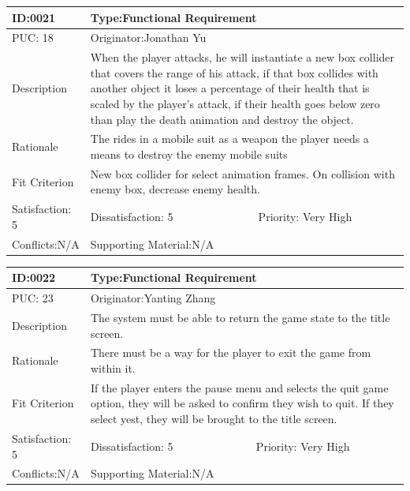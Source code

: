 \documentclass{article}
\begin{document}
	\begin{table}[H]
		\begin{tabular}{|l|l|l|}
			\hline
			ID:0021 & \multicolumn{2}{l|}{Type:Functional Requirement} \\ \hline
			PUC: 18& \multicolumn{2}{l|}{Originator:Jonathan Yu} \\ \hline
			Description & \multicolumn{2}{m{0.85\textwidth}|}{When the player attacks, he will instantiate a new box collider that covers the range of his attack, if that box collides with another object it loses a percentage  of their health that is scaled by the player’s attack, if their health goes below zero than play the death animation and destroy the object.}\\\hline
			Rationale & \multicolumn{2}{m{0.85\textwidth}|}{The rides in a mobile suit as a weapon the player needs a means to destroy the enemy mobile suits} \\ \hline
			Fit Criterion & \multicolumn{2}{m{0.85\textwidth}|}{New box collider for select animation frames. On collision with enemy box, decrease enemy health.} \\ \hline
			Satisfaction: 5 & Dissatisfaction: 5 & Priority: Very High \\ \hline
			Conflicts:N/A & \multicolumn{2}{l|}{Supporting Material:N/A} \\ \hline
		\end{tabular}
	\end{table}


	\begin{table}[H]
		\begin{tabular}{|l|l|l|}
			\hline
			ID:0022 & \multicolumn{2}{l|}{Type:Functional Requirement} \\ \hline
			PUC: 23& \multicolumn{2}{l|}{Originator:Yanting Zhang} \\ \hline
			Description & \multicolumn{2}{m{0.85\textwidth}|}{The system must be able to return the game state to the title screen.}\\\hline
			Rationale & \multicolumn{2}{m{0.85\textwidth}|}{There must be a way for the player to exit the game from within it.} \\ \hline
			Fit Criterion & \multicolumn{2}{m{0.85\textwidth}|}{If the player enters the pause menu and selects the quit game option, they will be asked to confirm they wish to quit. If they select yest, they will be brought to the title screen.} \\ \hline
			Satisfaction: 5 & Dissatisfaction: 5 & Priority: Very High \\ \hline
			Conflicts:N/A & \multicolumn{2}{l|}{Supporting Material:N/A} \\ \hline
		\end{tabular}
	\end{table}
\end{document}
